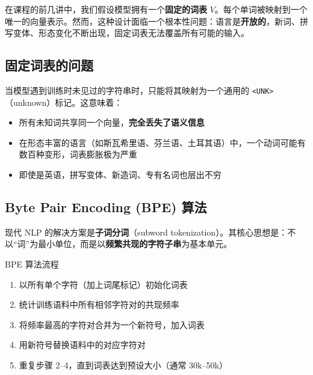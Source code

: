 \documentclass[a4paper]{article}
\begin{document}
在课程的前几讲中，我们假设模型拥有一个\textbf{固定的词表} $V$。每个单词被映射到一个唯一的向量表示。然而，这种设计面临一个根本性问题：语言是\textbf{开放的}，新词、拼写变体、形态变化不断出现，固定词表无法覆盖所有可能的输入。





\subsection{固定词表的问题}

当模型遇到训练时未见过的字符串时，只能将其映射为一个通用的 \texttt{<UNK>}（unknown）标记。这意味着：

\begin{itemize}
    \item 所有未知词共享同一个向量，\textbf{完全丢失了语义信息}
    \item 在形态丰富的语言（如斯瓦希里语、芬兰语、土耳其语）中，一个动词可能有数百种变形，词表膨胀极为严重
    \item 即使是英语，拼写变体、新造词、专有名词也层出不穷
\end{itemize}




\subsection{Byte Pair Encoding (BPE) 算法}

现代 NLP 的解决方案是\textbf{子词分词}（subword tokenization）。其核心思想是：不以``词''为最小单位，而是以\textbf{频繁共现的字符子串}为基本单元。

\begin{importantbox}{BPE 算法流程}
\begin{enumerate}
    \item 以所有单个字符（加上词尾标记）初始化词表
    \item 统计训练语料中所有相邻字符对的共现频率
    \item 将频率最高的字符对合并为一个新符号，加入词表
    \item 用新符号替换语料中的对应字符对
    \item 重复步骤 2--4，直到词表达到预设大小（通常 30k--50k）
\end{enumerate}
\end{importantbox}
\end{document}
